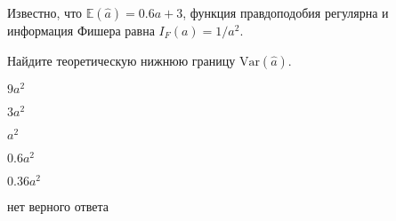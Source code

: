 
\begin{question}
Известно, что \(\mathbb{E}(\hat a) = 0.6a + 3\), функция правдоподобия
регулярна и информация Фишера равна \(I_F(a) = 1/a^2\).

Найдите теоретическую нижнюю границу \(\mathrm{Var}(\hat a)\).
\begin{answerlist}
  \item \(9 a^2\)
  \item \(3 a^2\)
  \item \(a^2\)
  \item \(0.6 a^2\)
  \item \(0.36 a^2\)
  \item нет верного ответа
\end{answerlist}
\end{question}


